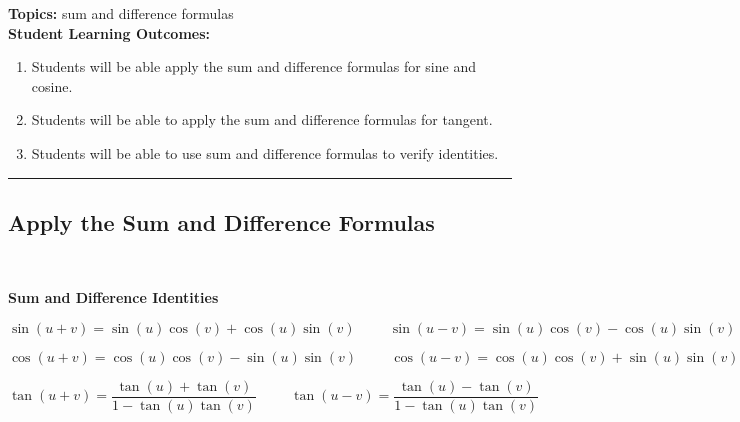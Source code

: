 

\noindent \textbf{Topics:}  sum and difference formulas\\

\noindent \textbf{Student Learning Outcomes:}
\begin{enumerate}
\item Students will be able apply the sum and difference formulas for sine and cosine.
\item Students will be able to apply the sum and difference formulas for tangent.
\item Students will be able to use sum and difference formulas to verify identities.

\end{enumerate}

\hrule 

\bigskip

\subsection{Apply the Sum and Difference Formulas} ~

\begin{boxthm}
{\bf Sum and Difference Identities}

$$\sin(u+v) = \sin(u) \cos(v) + \cos(u) \sin(v) \hspace{1cm}\sin(u-v) = \sin(u) \cos(v) - \cos(u) \sin(v)$$

$$\cos(u+v) = \cos(u)\cos(v) - \sin(u)\sin(v) \hspace{1cm}\cos(u-v) = \cos(u) \cos(v) + \sin(u) \sin(v)$$

$$\tan(u+v) = \frac{\tan(u) +\tan(v)}{1-\tan(u) \tan(v)} \hspace{1cm}\tan(u-v) =  \frac{\tan(u) -\tan(v)}{1-\tan(u) \tan(v)}$$

\end{boxthm}






